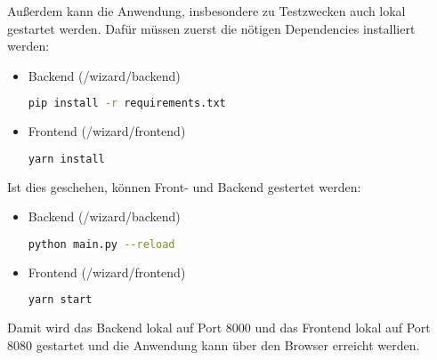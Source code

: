 Außerdem kann die Anwendung, insbesondere zu Testzwecken auch lokal gestartet werden. Dafür müssen zuerst die nötigen Dependencies installiert werden:

\begin{itemize}
	\item Backend (/wizard/backend)
	\begin{lstlisting}[language=bash]
	pip install -r requirements.txt
	\end{lstlisting}
	\item Frontend (/wizard/frontend)
	\begin{lstlisting}[language=bash]
	yarn install
	\end{lstlisting}
\end{itemize}

Ist dies geschehen, können Front- und Backend gestertet werden:

\begin{itemize}
	\item Backend (/wizard/backend)
	\begin{lstlisting}[language=bash]
	python main.py --reload
	\end{lstlisting}
	\item Frontend (/wizard/frontend)
	\begin{lstlisting}[language=bash]
	yarn start
	\end{lstlisting}
\end{itemize}

Damit wird das Backend lokal auf Port 8000 und das Frontend lokal auf Port 8080 gestartet und die Anwendung kann über den Browser erreicht werden.